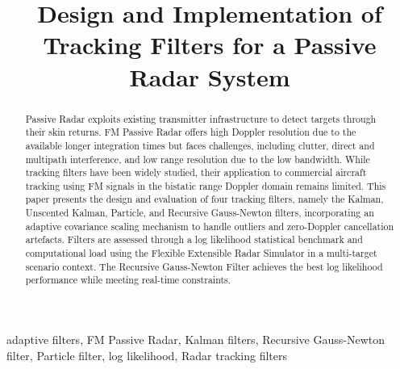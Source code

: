\documentclass[conference,10pt,a4paper]{IEEEtran}%
\begin{document}
\raggedbottom
%
%
%
\title{Design and Implementation of Tracking Filters for a Passive Radar System}
%
\author{%
}%
\maketitle
%
%
%
\begin{abstract}
Passive Radar exploits existing transmitter infrastructure to detect targets through their skin returns. FM Passive Radar offers high Doppler resolution due to the available longer integration times but faces challenges, including clutter, direct and multipath interference, and low range resolution due to the low bandwidth. While tracking filters have been widely studied, their application to commercial aircraft tracking using FM signals in the bistatic range Doppler domain remains limited. This paper presents the design and evaluation of four tracking filters, namely the Kalman, Unscented Kalman, Particle, and Recursive Gauss-Newton filters, incorporating an adaptive covariance scaling mechanism to handle outliers and zero-Doppler cancellation artefacts. Filters are assessed through a log likelihood statistical benchmark and computational load using the Flexible Extensible Radar Simulator in a multi-target scenario context. The Recursive Gauss-Newton Filter achieves the best log likelihood performance while meeting real-time constraints.
\end{abstract}
\begin{IEEEkeywords}
adaptive filters, FM Passive Radar, Kalman filters, Recursive Gauss-Newton filter, Particle filter, log likelihood, Radar tracking filters
\end{IEEEkeywords}
%
%
\end{document}
